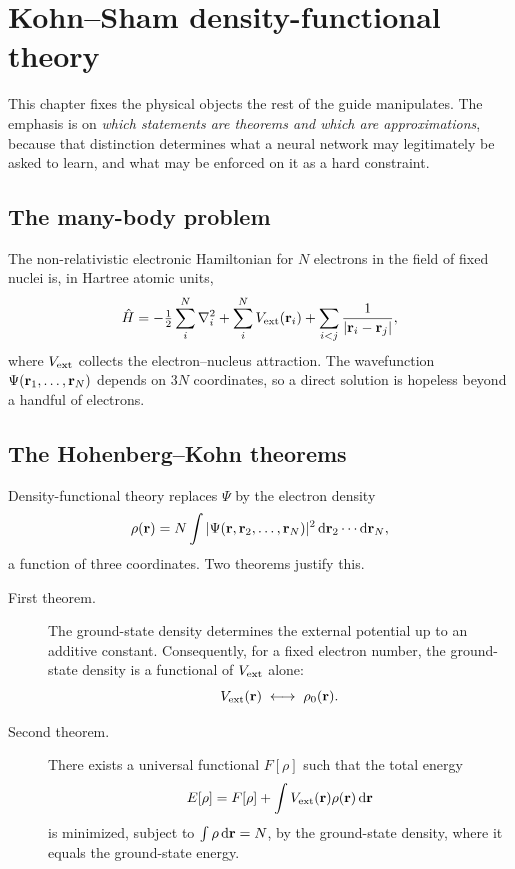 \chapter{Kohn--Sham density-functional theory}
\label{ch:ksdft}

This chapter fixes the physical objects the rest of the guide manipulates. The
emphasis is on \emph{which statements are theorems and which are
approximations}, because that distinction determines what a neural network may
legitimately be asked to learn, and what may be enforced on it as a hard
constraint.

\section{The many-body problem}

The non-relativistic electronic Hamiltonian for $N$ electrons in the field of
fixed nuclei is, in Hartree atomic units,
\begin{equation}
  \hat{H}
  = -\tfrac{1}{2}\sum_{i}^{N}\nabla_i^2
    + \sum_{i}^{N}V_{\mathrm{ext}}(\mathbf{r}_i)
    + \sum_{i<j}\frac{1}{|\mathbf{r}_i-\mathbf{r}_j|} ,
  \label{eq:hamiltonian}
\end{equation}
where $V_{\mathrm{ext}}$ collects the electron--nucleus attraction. The wavefunction
$\Psi(\mathbf{r}_1,\dots,\mathbf{r}_N)$ depends on $3N$ coordinates, so a direct solution is
hopeless beyond a handful of electrons.

\section{The Hohenberg--Kohn theorems}
\label{sec:hk}

Density-functional theory replaces $\Psi$ by the electron density
\begin{equation}
  \rho(\mathbf{r}) = N\int |\Psi(\mathbf{r},\mathbf{r}_2,\dots,\mathbf{r}_N)|^2\,
              \mathrm{d}\mathbf{r}_2\cdots\mathrm{d}\mathbf{r}_N ,
\end{equation}
a function of three coordinates. Two theorems justify this.

\begin{description}
  \item[First theorem.] The ground-state density determines the external
    potential up to an additive constant. Consequently, for a fixed electron
    number, the ground-state density is a functional of $V_{\mathrm{ext}}$ alone:
    \begin{equation}
      V_{\mathrm{ext}}(\mathbf{r}) \;\longleftrightarrow\; \rho_0(\mathbf{r}).
      \label{eq:hkmap}
    \end{equation}
  \item[Second theorem.] There exists a universal functional $F[\rho]$ such that
    the total energy
    \begin{equation}
      E[\rho] = F[\rho] + \int V_{\mathrm{ext}}(\mathbf{r})\rho(\mathbf{r})\,\mathrm{d}\mathbf{r}
      \label{eq:energyfunctional}
    \end{equation}
    is minimized, subject to $\int\rho\,\mathrm{d}\mathbf{r} = N$, by the ground-state
    density, where it equals the ground-state energy.
\end{description}

